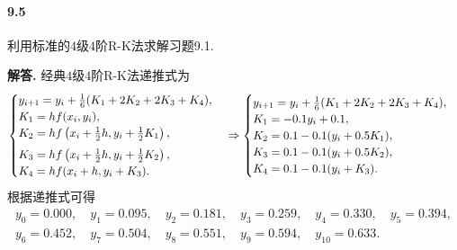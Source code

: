 \documentclass[12pt, a4paper, oneside]{ctexart}
\newenvironment{solution}{\par\noindent\textbf{解答. }}{\bigskip\par}
\def\add{\vspace{1ex}}  %
\begin{document}
\paragraph{9.5}利用标准的$4$级$4$阶R-K法求解习题9.1.
\begin{solution}
    经典$4$级$4$阶R-K法递推式为
    \begin{equation*}
        \begin{cases}
            y_{i+1} = y_i+\frac{1}{6}(K_1+2K_2+2K_3+K_4),\\
            K_1 = hf(x_i, y_i),\\
            K_2 = hf\left(x_i+\frac{1}{2}h, y_i+\frac{1}{2}K_1\right),\add\\
            K_3 = hf\left(x_i+\frac{1}{2}h, y_i+\frac{1}{2}K_2\right),\\
            K_4 = hf(x_i+h, y_i+K_3).
        \end{cases}\Rightarrow\begin{cases}
            y_{i+1} = y_i+\frac{1}{6}(K_1+2K_2+2K_3+K_4),\\
            K_1 = -0.1y_i+0.1,\\
            K_2 = 0.1-0.1(y_i+0.5K_1),\\
            K_3 = 0.1-0.1(y_i+0.5K_2),\\
            K_4 = 0.1-0.1(y_i+K_3).
        \end{cases}
    \end{equation*}
    根据递推式可得
    \begin{equation*}
        \begin{array}{l}
            y_{0} = 0.000,\quad y_{1} = 0.095,\quad y_{2} = 0.181,\quad y_{3} = 0.259,\quad y_{4} = 0.330,\quad y_{5} = 0.394,\\
            y_{6} = 0.452,\quad y_{7} = 0.504,\quad y_{8} = 0.551,\quad y_{9} = 0.594,\quad y_{10} = 0.633.
        \end{array}
    \end{equation*}
\end{solution}
\end{document}
